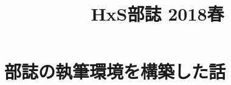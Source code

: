 \documentclass[10.5pt,a4paper]{jsbook}
\title{HxS部誌 2018春}
\date{}
\begin{document}
\maketitle
\tableofcontents

\chapter{部誌の執筆環境を構築した話}

\end{document}
